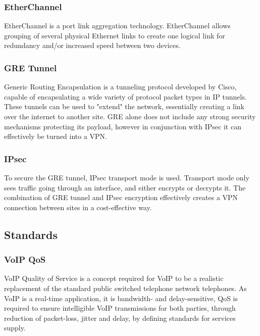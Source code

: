 \subsubsection{EtherChannel}
EtherChannel is a port link aggregation technology. EtherChannel allows grouping of several physical Ethernet links to create one logical link for redundancy and/or increased speed between two devices. \cite{EtherChannel}

\subsubsection{GRE Tunnel}
Generic Routing Encapsulation is a tunneling protocol developed by Cisco, capable of encapsulating a wide variety of protocol packet types in IP tunnels.
These tunnels can be used to "extend" the network, essentially creating a link over the internet to another site.
GRE alone does not include any strong security mechanisms protecting its payload, however in conjunction with IPsec it can effectively be turned into a VPN.

\subsubsection{IPsec}
To secure the GRE tunnel, IPsec transport mode is used.
Transport mode only sees traffic going through an interface, and either encrypts or decrypts it.
The combination of GRE tunnel and IPsec encryption effectively creates a VPN connection between sites in a cost-effective way.

\subsection{Standards}

\subsubsection{VoIP QoS}
VoIP Quality of Service is a concept required for VoIP to be a realistic replacement of the standard public switched telephone network telephones.
As VoIP is a real-time application, it is bandwidth- and delay-sensitive, QoS is required to ensure intelligible VoIP transmissions for both parties, through reduction of packet-loss, jitter and delay, by defining standards for services supply. \cite{VoIP-QoS}
